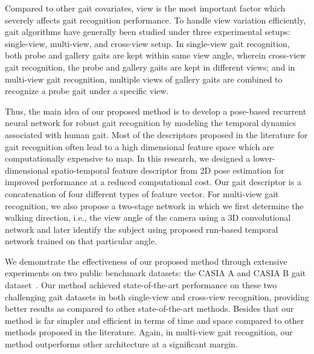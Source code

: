 Compared to other gait covariates, view is the most important factor which severely affects gait recognition performance. To handle view variation efficiently, gait algorithms have generally been studied under three experimental setups: single-view, multi-view, and cross-view setup. In single-view gait recognition, both probe and gallery gaits are kept within same view angle, wherein cross-view gait recognition, the probe and gallery gaits are kept in different views; and in multi-view gait recognition, multiple views of gallery gaits are combined to recognize a probe gait under a specific view.

Thus, the main idea of our proposed method is to develop a pose-based recurrent neural network for robust gait recognition by modeling the temporal dynamics associated with human gait. Most of the descriptors proposed in the literature for gait recognition often lead to a high dimensional feature space which are computationally expensive to map. In this research, we designed a lower-dimensional spatio-temporal feature descriptor from 2D pose estimation for improved performance at a reduced computational cost. Our gait descriptor is a concatenation of four different types of feature vector. For multi-view gait recognition, we also propose a two-stage network in which we first determine the walking direction, i.e., the view angle of the camera using a 3D convolutional network and later identify the subject using proposed \gls{rnn}-based temporal network trained on that particular angle. 

We demonstrate the effectiveness of our proposed method through extensive experiments on two public benchmark datasets: the CASIA A and CASIA B gait dataset~\cite{Yu_06}. Our method achieved state-of-the-art performance on these two challenging gait datasets in both single-view and cross-view recognition, providing better results as compared to other state-of-the-art methods. Besides that our method is far simpler and efficient in terms of time and space compared to other methods proposed in the literature. Again, in multi-view gait recognition, our method outperforms other architecture at a significant margin. 



